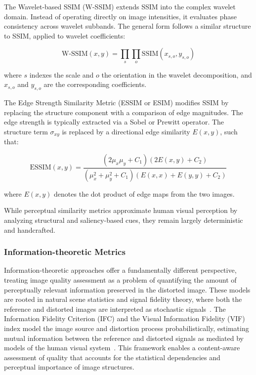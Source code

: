 The Wavelet-based SSIM (W-SSIM) extends SSIM into the complex wavelet domain. Instead of operating directly on image intensities, it evaluates phase consistency across wavelet subbands. The general form follows a similar structure to SSIM, applied to wavelet coefficients:

\begin{equation}
\text{W-SSIM}(x, y) = \prod_{s} \prod_{o} \text{SSIM}(x_{s,o}, y_{s,o})
\end{equation}

where $s$ indexes the scale and $o$ the orientation in the wavelet decomposition, and $x_{s,o}$ and $y_{s,o}$ are the corresponding coefficients.

The Edge Strength Similarity Metric (ESSIM or ESIM) modifies SSIM by replacing the structure component with a comparison of edge magnitudes. The edge strength is typically extracted via a Sobel or Prewitt operator. The structure term $\sigma_{xy}$ is replaced by a directional edge similarity $E(x, y)$, such that:

\begin{equation}
\text{ESSIM}(x, y) = \frac{(2\mu_x \mu_y + C_1)(2E(x, y) + C_2)}{(\mu_x^2 + \mu_y^2 + C_1)(E(x, x) + E(y, y) + C_2)}
\end{equation}

where $E(x, y)$ denotes the dot product of edge maps from the two images.

While perceptual similarity metrics approximate human visual perception by analyzing structural and saliency-based cues, they remain largely deterministic and handcrafted.

\subsubsection{Information-theoretic Metrics}\label{sec:learning_based_metrics}

Information-theoretic approaches offer a fundamentally different perspective, treating image quality assessment as a problem of quantifying the amount of perceptually relevant information preserved in the distorted image. These models are rooted in natural scene statistics and signal fidelity theory, where both the reference and distorted images are interpreted as stochastic signals~\cite{sheikh2005ifc}. The Information Fidelity Criterion (IFC) and the Visual Information Fidelity (VIF) index model the image source and distortion process probabilistically, estimating mutual information between the reference and distorted signals as mediated by models of the human visual system~\cite{Sheikh2006VIF}. This framework enables a content-aware assessment of quality that accounts for the statistical dependencies and perceptual importance of image structures.

